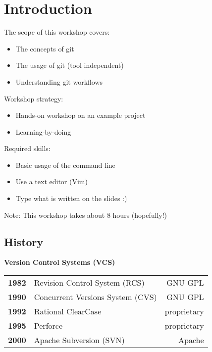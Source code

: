 \section{Introduction}
\begin{frame}
  \slidetitle
  The scope of this workshop covers:
  \begin{itemize}
    \item The concepts of git
    \item The usage of git (tool independent)
    \item Understanding git workflows
  \end{itemize}

  \pause
  \vspace{1em}
  Workshop strategy:
  \begin{itemize}
    \item Hands-on workshop on an example project
    \item Learning-by-doing
  \end{itemize}

  \pause
  \vspace{1em}
  Required skills:
  \begin{itemize}
    \item Basic usage of the command line
    \item Use a text editor (Vim)
    \item Type what is written on the slides :)
  \end{itemize}

  \vspace{1em}
  Note: This workshop takes about 8 hours (hopefully!)
\end{frame}

\subsection{History}
\begin{frame}
  \subslidetitle

  \textbf{Version Control Systems (VCS)}
  \pause
  \\
  \begin{tabular}{lp{6cm}r}
    \textbf{1982} & Revision Control System (RCS) & GNU GPL \\
    \pause
    \textbf{1990} & Concurrent Versions System (CVS) & GNU GPL \\
    \pause
    \textbf{1992} & Rational ClearCase & proprietary \\
    \pause
    \textbf{1995} & Perforce  & proprietary \\
    \pause
    \textbf{2000} & Apache Subversion (SVN)  & Apache \\
  \end{tabular}
\end{frame}

